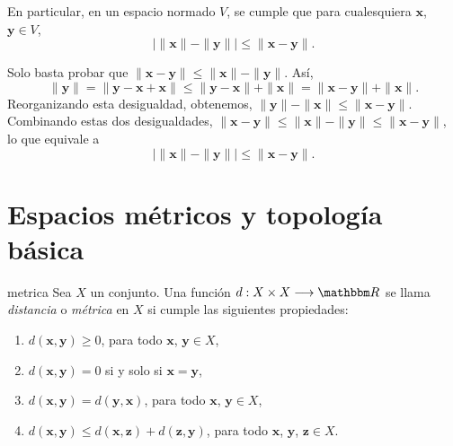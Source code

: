 \begin{corollary}{}{}
    En particular, en un espacio normado $V$, se cumple que para cualesquiera $\mathbf{x}$, $\mathbf{y} \in V$,
    $$\big| \| \mathbf{x} \| - \| \mathbf{y} \| \big| \leq \| \mathbf{x} - \mathbf{y} \|.$$

    \tcblower
    \demostracion Solo basta probar que $\| \mathbf{x} - \mathbf{y} \| \leq \| \mathbf{x} \| - \| \mathbf{y} \|$. Así,
    $$\| \mathbf{y} \| = \| \mathbf{y} - \mathbf{x} + \mathbf{x} \| \leq \| \mathbf{y} - \mathbf{x} \| + \| \mathbf{x} \| = \| \mathbf{x} - \mathbf{y} \| + \| \mathbf{x} \|.$$
    Reorganizando esta desigualdad, obtenemos, $\| \mathbf{y} \| - \| \mathbf{x} \| \leq \| \mathbf{x} - \mathbf{y} \|$. Combinando estas dos desigualdades, $\| \mathbf{x} - \mathbf{y} \| \leq \| \mathbf{x} \| - \| \mathbf{y} \| \leq \| \mathbf{x} - \mathbf{y} \|$, lo que equivale a
    $$\big| \| \mathbf{x} \| - \| \mathbf{y} \| \big| \leq \| \mathbf{x} - \mathbf{y} \|.$$
\end{corollary}

\newpage

\section{Espacios métricos y topología básica}

\begin{definicion}{}{metrica}
    Sea $X$ un conjunto. Una función $d: X \times X \longrightarrow \RR$ se llama \emph{distancia} o \emph{métrica} en $X$ si cumple las siguientes propiedades:
    \begin{enumerate}[label=\roman*), topsep=6pt, itemsep=0pt]
        \item $d(\mathbf{x}, \mathbf{y}) \geq 0$, para todo $\mathbf{x}$, $\mathbf{y} \in X$,
        \item $d(\mathbf{x}, \mathbf{y}) = 0$ si y solo si $\mathbf{x} = \mathbf{y}$,
        \item $d(\mathbf{x}, \mathbf{y}) = d(\mathbf{y}, \mathbf{x})$, para todo $\mathbf{x}$, $\mathbf{y} \in X$,
        \item $d(\mathbf{x}, \mathbf{y}) \leq d(\mathbf{x}, \mathbf{z}) + d(\mathbf{z}, \mathbf{y})$, para todo $\mathbf{x}$, $\mathbf{y}$, $\mathbf{z} \in X$.
    \end{enumerate}
\end{definicion}

